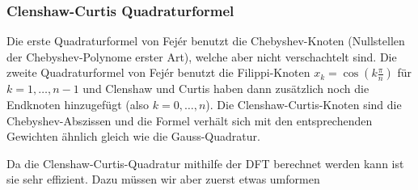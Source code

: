\subsubsection{Clenshaw-Curtis Quadraturformel}
Die erste Quadraturformel von Fejér benutzt die Chebyshev-Knoten (Nullstellen der Chebyshev-Polynome erster Art), welche aber nicht verschachtelt sind.
Die zweite Quadraturformel von Fejér benutzt die Filippi-Knoten $x_k = \cos\left( k \frac{\pi}{n} \right)$ für $k = 1, \ldots, n - 1$
und Clenshaw und Curtis haben dann zusätzlich noch die Endknoten hinzugefügt (also $k = 0, \ldots, n$).
Die Clenshaw-Curtis-Knoten sind die Chebyshev-Abszissen und die Formel verhält sich mit den entsprechenden Gewichten ähnlich gleich wie die Gauss-Quadratur.

Da die Clenshaw-Curtis-Quadratur mithilfe der DFT berechnet werden kann ist sie sehr effizient.
Dazu müssen wir aber zuerst etwas umformen
